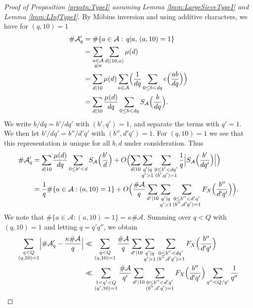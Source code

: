 \documentclass[10pt]{amsart}
\theoremstyle{plain}
\numberwithin{sblmm}{thrm}
\numberwithin{equation}{section}
\begin{document}
\begin{proof}[Proof of Proposition \ref{prpstn:TypeI} assuming Lemma \ref{lmm:LargeSieveTypeI} and Lemma \ref{lmm:LInfTypeI}]
%
By M\"obius inversion and using additive characters, we have for $(q,10)=1$
%
\begin{align*}
\#\mathcal{A}'_q&=\#\{a\in\mathcal{A}:\,q|a,\,(a,10)=1\}\\
&=\sum_{\substack{a\in\mathcal{A}\\ q|a}}\sum_{d|(10,a)}\mu(d)\\
&=\sum_{d|10}\mu(d)\sum_{a\in\mathcal{A}}\Bigl(\frac{1}{d q}\sum_{0\le b<d q}e\Bigl(\frac{a b}{d q}\Bigr)\Bigr)\\
&=\sum_{d|10}\frac{\mu(d)}{d q}\sum_{0\le b< d q}S_{\mathcal{A}}\Bigl(\frac{b}{d q}\Bigr).
\end{align*}
We write $b/d q=b'/d q'$ with $(b',q')=1$, and separate the terms with $q'=1$. We then let $b'/d q'=b''/d' q'$ with $(b'',d' q')=1$. For $(q,10)=1$ we see that this representation is unique for all $b,d$ under consideration. Thus
\begin{align*}
\#\mathcal{A}'_q&=\sum_{d|10}\frac{\mu(d)}{d q}\sum_{0\le b'< d}S_{\mathcal{A}}\Bigl(\frac{b'}{d}\Bigr)+O\Bigl(\sum_{d|10}\sum_{\substack{q'|q\\ q'>1}}\sum_{\substack{0\le b'< d q'\\ (b',q')=1}}\frac{1}{q}\Bigl|S_{\mathcal{A}}\Bigl(\frac{b'}{d q'}\Bigr)\Bigr|\Bigr)\\
&=\frac{1}{q}\#\{a\in\mathcal{A}:(a,10)=1\}+O\Bigl(\frac{\#\mathcal{A}}{q}\sum_{d'|10}\sum_{\substack{q'|q\\ q'>1}}\sum_{\substack{0\le b''< d' q'\\ (b'',d' q')=1}}F_X\Bigl(\frac{b''}{d' q'}\Bigr)\Bigr).
\end{align*}
%
We note that $\#\{a\in\mathcal{A}:(a,10)=1\}=\kappa\#\mathcal{A}$. Summing over $q<Q$ with $(q,10)=1$ and letting $q=q' q''$, we obtain
%
\begin{align}
\sum_{\substack{q<Q\\ (q,10)=1}}\Bigl|\#\mathcal{A}_q'-\frac{\kappa\#\mathcal{A}}{q}\Bigr|
&\ll \sum_{\substack{q<Q\\ (q,10)=1}}\frac{\#\mathcal{A}}{q}\sum_{d'|10}\sum_{\substack{q'|q\\ q'>1}}\sum_{\substack{0\le b''< d q'\\ (b'',d' q')=1}}F_X\Bigl(\frac{b''}{d' q'}\Bigr)\nonumber\\
&\ll \sum_{\substack{1<q'<Q\\ (q',10)=1}}\frac{\#\mathcal{A}}{q'}\sum_{d'|10}\sum_{\substack{0\le b''< d' q'\\ (b'',d' q')=1}}F_X\Bigl(\frac{b''}{d' q'}\Bigr)\sum_{q''<Q/q'}\frac{1}{q''}\nonumber\\

\end{align}
\end{proof}
\end{document}
